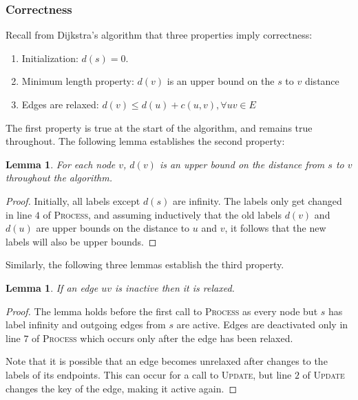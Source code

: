 \documentclass[12pt]{article}
\newtheorem{lemma}[theorem]{Lemma}
\begin{document}
\subsubsection{Correctness}
\label{sec:correctness}

Recall from Dijkstra's algorithm that three properties imply correctness:
\begin{enumerate}
\item Initialization: $d(s) = 0$.
\item Minimum length property: $d(v)$ is an upper bound on the $s$ to $v$ distance
\item Edges are relaxed: $d(v) \leq d(u) + c(u,v), \forall uv \in E$
\end{enumerate}

The first property is true at the start of the algorithm, and remains true throughout. The following lemma establishes the second property:\\

\begin{lemma}
  For each node $v$, $d(v)$ is an upper bound on the distance from $s$ to $v$ throughout the algorithm.
\end{lemma}

\begin{proof}
  Initially, all labels except $d(s)$ are infinity. The labels only get changed in line $4$ of \textsc{Process}, and assuming inductively that the old labels $d(v)$ and $d(u)$ are upper bounds on the distance to $u$ and $v$, it follows that the new labels will also be upper bounds.
\end{proof}

Similarly, the following three lemmas establish the third property.\\

\begin{lemma}
  If an edge $uv$ is inactive then it is relaxed.
\end{lemma}

\begin{proof}
  The lemma holds before the first call to \textsc{Process} as every node but $s$ has label infinity and outgoing edges from $s$ are active. Edges are deactivated only in line $7$ of \textsc{Process} which occurs only after the edge has been relaxed.

  Note that it is possible that an edge becomes unrelaxed after changes to the labels of its endpoints. This can occur for a call to \textsc{Update}, but line $2$ of \textsc{Update} changes the key of the edge, making it active again.
\end{proof}
\end{document}

